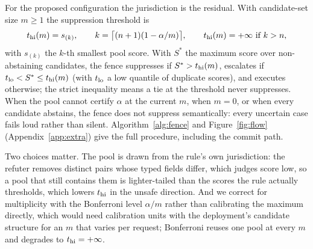 For the proposed configuration the jurisdiction is the residual. With candidate-set size $m\ge1$ the suppression threshold is
\begin{equation}\label{eq:thi}
t_{\mathrm{hi}}(m)=s_{(k)},\qquad k=\big\lceil (n+1)(1-\alpha/m)\big\rceil,\qquad t_{\mathrm{hi}}(m)=+\infty\ \text{if } k>n,
\end{equation}
with $s_{(k)}$ the $k$-th smallest pool score. With $S^\ast$ the maximum score over non-abstaining candidates, the fence suppresses if $S^\ast>t_{\mathrm{hi}}(m)$, escalates if $t_{\mathrm{lo}}<S^\ast\le t_{\mathrm{hi}}(m)$ (with $t_{\mathrm{lo}}$ a low quantile of duplicate scores), and executes otherwise; the strict inequality means a tie at the threshold never suppresses. When the pool cannot certify $\alpha$ at the current $m$, when $m=0$, or when every candidate abstains, the fence does not suppress semantically: every uncertain case fails loud rather than silent. Algorithm~\ref{alg:fence} and Figure~\ref{fig:flow} (Appendix~\ref{app:extra}) give the full procedure, including the commit path.

Two choices matter. The pool is drawn from the rule's own jurisdiction: the refuter removes distinct pairs whose typed fields differ, which judges score low, so a pool that still contains them is lighter-tailed than the scores the rule actually thresholds, which lowers $t_{\mathrm{hi}}$ in the unsafe direction. And we correct for multiplicity with the Bonferroni level $\alpha/m$ rather than calibrating the maximum directly, which would need calibration units with the deployment's candidate structure for an $m$ that varies per request; Bonferroni reuses one pool at every $m$ and degrades to $t_{\mathrm{hi}}=+\infty$.
